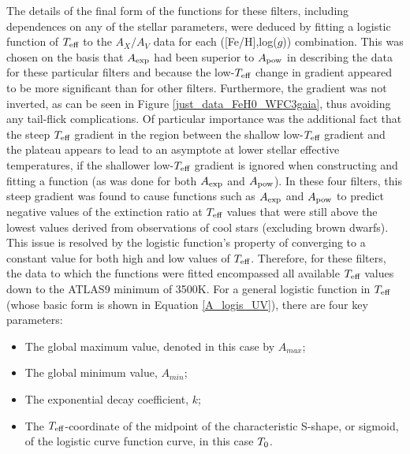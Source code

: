 \documentclass[12pt, a4paper]{report}
\begin{document}
The details of the final form of the functions for these filters, including dependences on any of the stellar parameters, were deduced by fitting a logistic function of $T_{\textnormal{eff}}$ to the $A_{X}/A_{V}$ data for each ([Fe/H],log($g$)) combination. This was chosen on the basis that $A_{\textnormal{exp}}$ had been superior to $A_{\textnormal{pow}}$ in describing the data for these particular filters and because the low-$T_{\textnormal{eff}}$ change in gradient appeared to be more significant than for other filters. Furthermore, the gradient was not inverted, as can be seen in Figure \ref{just_data_FeH0_WFC3gaia}, thus avoiding any tail-flick complications. Of particular importance was the additional fact that the steep $T_{\textnormal{eff}}$ gradient in the region between the shallow low-$T_{\textnormal{eff}}$ gradient and the plateau appears to lead to an asymptote at lower stellar effective temperatures, if the shallower low-$T_{\textnormal{eff}}$ gradient is ignored when constructing and fitting a function (as was done for both $A_{\textnormal{exp}}$ and $A_{\textnormal{pow}}$). In these four filters, this steep gradient was found to cause functions such as $A_{\textnormal{exp}}$ and $A_{\textnormal{pow}}$ to predict negative values of the extinction ratio at $T_{\textnormal{eff}}$ values that were still above the lowest values derived from observations of cool stars (excluding brown dwarfs). This issue is resolved by the logistic function's property of converging to a constant value for both high and low values of $T_{\textnormal{eff}}$. Therefore, for these filters, the data to which the functions were fitted encompassed all available $T_{\textnormal{eff}}$ values down to the ATLAS9 minimum of 3500K. For a general logistic function in $T_{\textnormal{eff}}$ (whose basic form is shown in Equation \ref{A_logis_UV}), there are four key parameters:

\begin{itemize}
\item The global maximum value, denoted in this case by $A_{max}$;
\item The global minimum value, $A_{min}$;
\item The exponential decay coefficient, $k$;
\item The $T_{\textnormal{eff}}$-coordinate of the midpoint of the characteristic S-shape, or sigmoid, of the logistic curve function curve, in this case $T_{\textnormal{0}}$.
\end{itemize}
\end{document}
